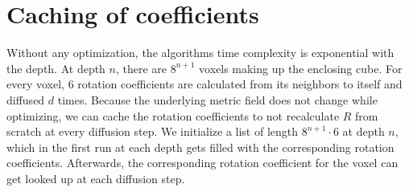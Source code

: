 \documentclass[../thesis.tex]{subfiles}
\begin{document}
\section{Caching of coefficients}
Without any optimization, the algorithms time complexity is exponential with the depth.
At depth $n$, there are $8^{n+1}$ voxels making up the enclosing cube.
For every voxel, 6 rotation coefficients are calculated from its neighbors to itself
and diffused $d$ times.
Because the underlying metric field does not change while optimizing,
we can cache the rotation coefficients to not recalculate $R$ from scratch at every diffusion step.
We initialize a list of length $8^{n+1}\cdot 6$ at depth $n$, which in the first run at each depth
gets filled with the corresponding rotation coefficients.
Afterwards, the corresponding rotation coefficient for the voxel can get
looked up at each diffusion step.
\end{document}
